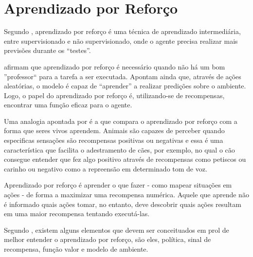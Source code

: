 \section{Aprendizado por Reforço}\label{aprendizado}

Segundo , aprendizado por reforço é uma técnica de aprendizado
intermediária, entre supervisionado e não supervisionado, onde o agente precisa realizar mais
previsões durante os ``testes''.

 afirmam que aprendizado por reforço é necessário quando não há um
bom ''professor`` para a tarefa a ser executada. Apontam ainda que, através de ações aleatórias, o
modelo é capaz de ``aprender'' a realizar predições sobre o ambiente. Logo, o papel do aprendizado
por reforço é, utilizando-se de recompensas, encontrar uma função eficaz para o agente.

Uma analogia apontada por  é a que compara o aprendizado por
reforço com a forma que seres vivos aprendem. Animais são capazes de perceber quando especificas
sensações são recompensas positivas ou negativas e essa é uma característica que facilita o
adestramento de cães, por exemplo, no qual o cão consegue entender que fez algo positivo através de
recompensas como petiscos ou carinho ou negativo como a repreensão em determinado tom de voz.

\begin{citacao}
    Aprendizado por reforço é aprender o que fazer - como mapear situações em ações - de forma a
    maximizar uma recompensa numérica. Aquele que aprende não é informado quais ações tomar, no
    entanto, deve descobrir quais ações resultam em uma maior recompensa tentando executá-las.
    \cite{sutton2018reinforcement}
\end{citacao}

Segundo , existem alguns elementos que devem ser conceituados em
prol de melhor entender o aprendizado por reforço, são eles, política, sinal de recompensa, função
valor e modelo de ambiente.

